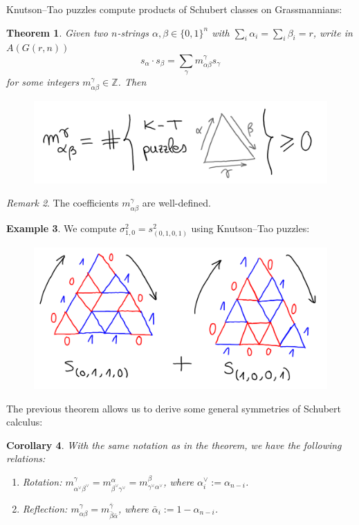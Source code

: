 \documentclass[12pt,a4paper]{amsart}
\theoremstyle{plain}
\newtheorem{thm}{Theorem}[section]
\newtheorem{cor}[thm]{Corollary}
\theoremstyle{definition}
\newtheorem{exmp}[thm]{Example}
\theoremstyle{remark}
\newtheorem{rem}[thm]{Remark}
\begin{document}
Knutson--Tao puzzles compute products of Schubert classes on Grassmannians:

\begin{thm}
  Given two $n$-strings $\alpha,\beta \in \{0, 1\}^{n}$ with $\sum_{i} \alpha_{i} = \sum_{i} \beta_{i} = r$, write in $A(G(r,n))$
  \[ s_{\alpha}\cdot s_{\beta} = \sum_{\gamma} m_{\alpha\beta}^{\gamma} s_{\gamma} \]
  for some integers $m_{\alpha\beta}^{\gamma} \in \mathbb{Z}$.
  Then
  \begin{figure}[H]
    \centering
    \includegraphics[scale=.7]{pictures/knutsontaocoefficients}
  \end{figure}
\end{thm}

\begin{rem}
  The coefficients $m_{\alpha\beta}^{\gamma}$ are well-defined.
\end{rem}

\begin{exmp}
  We compute $\sigma_{1,0}^{2} = s_{(0,1,0,1)}^{2}$ using Knutson--Tao puzzles:
  \begin{figure}[H]
    \centering
    \includegraphics[scale=.7]{pictures/knutsontaosum}
  \end{figure}
\end{exmp}

The previous theorem allows us to derive some general symmetries of Schubert calculus:

\begin{cor}
  With the same notation as in the theorem, we have the following relations:
  \begin{enumerate}[label=(\roman*)]
    \item Rotation: $m_{\alpha^{\vee}\beta^{\vee}}^{\gamma} = m_{\beta^{\vee}\gamma^{\vee}}^{\alpha} = m_{\gamma^{\vee}\alpha^{\vee}}^{\beta}$, where $\alpha_{i}^{\vee} := \alpha_{n - i}$.
    \item Reflection: $m_{\alpha\beta}^{\gamma} = m_{\bar{\beta}\bar{\alpha}}^{\bar{\gamma}}$, where $\bar{\alpha}_{i} := 1 - \alpha_{n - i}$.
  \end{enumerate}
\end{cor}
\end{document}
